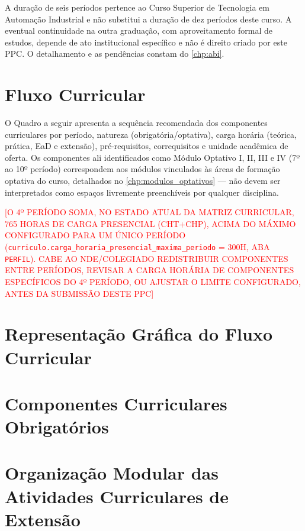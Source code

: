 A duração de seis períodos pertence ao Curso Superior de Tecnologia em Automação Industrial e não substitui a duração de dez períodos deste curso. A eventual continuidade na outra graduação, com aproveitamento formal de estudos, depende de ato institucional específico e não é direito criado por este PPC. O detalhamento e as pendências constam do \autoref{chp:abi}.

\section{Fluxo Curricular}
\label{sec:fluxo}

O Quadro a seguir apresenta a sequência recomendada dos componentes curriculares por período, natureza (obrigatória/optativa), carga horária (teórica, prática, EaD e extensão), pré-requisitos, correquisitos e unidade acadêmica de oferta. Os componentes ali identificados como Módulo Optativo I, II, III e IV (7º ao 10º período) correspondem aos módulos vinculados às áreas de formação optativa do curso, detalhados no \autoref{chp:modulos_optativos} — não devem ser interpretados como espaços livremente preenchíveis por qualquer disciplina.

\textcolor{red}{[O 4º PERÍODO SOMA, NO ESTADO ATUAL DA MATRIZ CURRICULAR, 765 HORAS DE CARGA PRESENCIAL (CHT+CHP), ACIMA DO MÁXIMO CONFIGURADO PARA UM ÚNICO PERÍODO (\texttt{curriculo.carga\_horaria\_presencial\_maxima\_periodo} = 300H, ABA \texttt{PERFIL}). CABE AO NDE/COLEGIADO REDISTRIBUIR COMPONENTES ENTRE PERÍODOS, REVISAR A CARGA HORÁRIA DE COMPONENTES ESPECÍFICOS DO 4º PERÍODO, OU AJUSTAR O LIMITE CONFIGURADO, ANTES DA SUBMISSÃO DESTE PPC]}



\newpage
\section{Representação Gráfica do Fluxo Curricular}

\begin{landscape}

\end{landscape}

\newpage
\section{Componentes Curriculares Obrigatórios}


\section{Organização Modular das Atividades Curriculares de Extensão}
\label{sec:ace}

